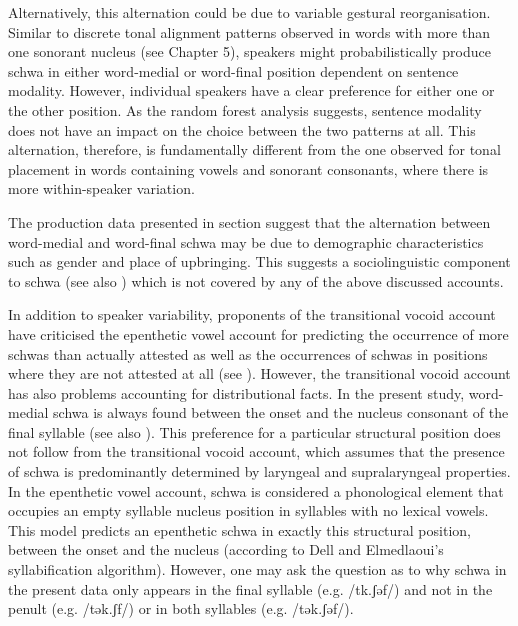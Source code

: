 Alternatively, this alternation could be due to variable gestural reorganisation. Similar to discrete tonal alignment patterns observed in words with more than one sonorant nucleus (see Chapter 5), speakers might probabilistically produce schwa in either word-medial or word-final position dependent on sentence modality. However, individual speakers have a clear preference for either one or the other position. As the random forest analysis suggests, sentence modality does not have an impact on the choice between the two patterns at all. This alternation, therefore, is fundamentally different from the one observed for tonal placement in words containing vowels and sonorant consonants, where there is more within-speaker variation. 

The production data presented in section  suggest that the alternation between word-medial and word-final schwa may be due to demographic characteristics such as gender and place of upbringing. This suggests a sociolinguistic component to schwa (see also \citealt{Boukous2012}) which is not covered by any of the above discussed accounts. 

In addition to speaker variability, proponents of the transitional vocoid account have criticised the epenthetic vowel account for predicting the occurrence of more schwas than actually attested as well as the occurrences of schwas in positions where they are not attested at all (see ). However, the transitional vocoid account has also problems accounting for distributional facts. In the present study, word-medial schwa is always found between the onset and the nucleus consonant of the final syllable (see also \citealt{GordonNafi2012}). This preference for a particular structural position does not follow from the transitional vocoid account, which assumes that the presence of schwa is predominantly determined by laryngeal and supralaryngeal properties. In the epenthetic vowel account, schwa is considered a phonological element that occupies an empty syllable nucleus position in syllables with no lexical vowels. This model predicts an epenthetic schwa in exactly this structural position, between the onset and the nucleus (according to Dell and Elmedlaoui’s syllabification algorithm). However, one may ask the question as to why schwa in the present data only appears in the final syllable (e.g. /tk.ʃəf/) and not in the penult (e.g. /tək.ʃf/) or in both syllables (e.g. /tək.ʃəf/).  


